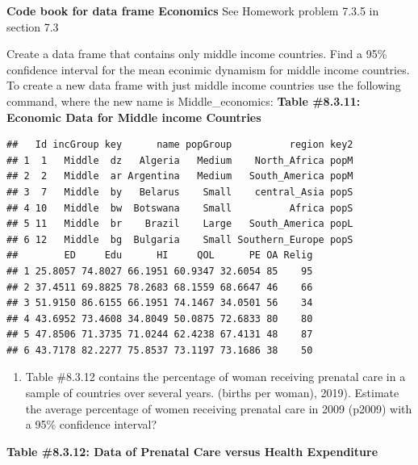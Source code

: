 \documentclass[
]{book}
\newenvironment{Shaded}{\begin{snugshade}}{\end{snugshade}}
\newcommand{\KeywordTok}[1]{\textcolor[rgb]{0.13,0.29,0.53}{\textbf{#1}}}
\newcommand{\NormalTok}[1]{#1}
\newcommand{\OperatorTok}[1]{\textcolor[rgb]{0.81,0.36,0.00}{\textbf{#1}}}
\newcommand{\StringTok}[1]{\textcolor[rgb]{0.31,0.60,0.02}{#1}}
\providecommand{\tightlist}{%
  \setlength{\itemsep}{0pt}\setlength{\parskip}{0pt}}
\begin{document}
\textbf{Code book for data frame Economics} See Homework problem 7.3.5 in section 7.3

Create a data frame that contains only middle income countries. Find a 95\% confidence interval for the mean econimic dynamism for middle income countries. To create a new data frame with just middle income countries use the following command, where the new name is Middle\_economics:
\textbf{Table \#8.3.11: Economic Data for Middle income Countries}

\begin{Shaded}
\end{Shaded}

\begin{verbatim}
##   Id incGroup key      name popGroup          region key2
## 1  1   Middle  dz   Algeria   Medium    North_Africa popM
## 2  2   Middle  ar Argentina   Medium   South_America popM
## 3  7   Middle  by   Belarus    Small    central_Asia popS
## 4 10   Middle  bw  Botswana    Small          Africa popS
## 5 11   Middle  br    Brazil    Large   South_America popL
## 6 12   Middle  bg  Bulgaria    Small Southern_Europe popS
##        ED     Edu      HI     QOL      PE OA Relig
## 1 25.8057 74.8027 66.1951 60.9347 32.6054 85    95
## 2 37.4511 69.8825 78.2683 68.1559 68.6647 46    66
## 3 51.9150 86.6155 66.1951 74.1467 34.0501 56    34
## 4 43.6952 73.4608 34.8049 50.0875 72.6833 80    80
## 5 47.8506 71.3735 71.0244 62.4238 67.4131 48    87
## 6 43.7178 82.2277 75.8537 73.1197 73.1686 38    50
\end{verbatim}

\begin{enumerate}
\def\labelenumi{\arabic{enumi}.}
\setcounter{enumi}{5}
\tightlist
\item
  Table \#8.3.12 contains the percentage of woman receiving prenatal care in a sample of countries over several years. (births per woman), 2019). Estimate the average percentage of women receiving prenatal care in 2009 (p2009) with a 95\% confidence interval?
\end{enumerate}

\textbf{Table \#8.3.12: Data of Prenatal Care versus Health Expenditure}
\end{document}
